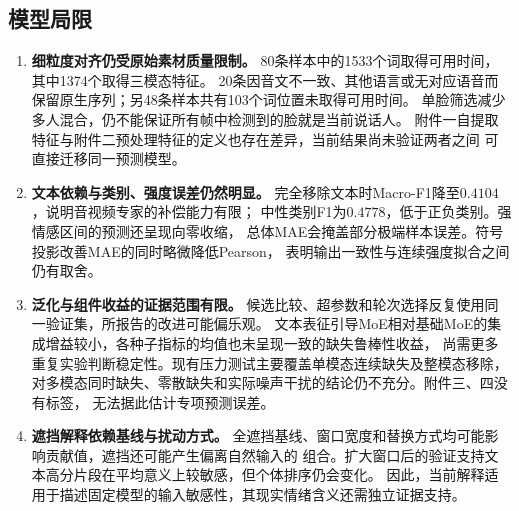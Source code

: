 \documentclass[bwprint]{gmcmthesis}
\begin{document}
\subsection{模型局限}
\begin{enumerate}
 \item \textbf{细粒度对齐仍受原始素材质量限制。}
 80条样本中的1533个词取得可用时间，其中1374个取得三模态特征。
 20条因音文不一致、其他语言或无对应语音而保留原生序列；另48条样本共有103个词位置未取得可用时间。
 单脸筛选减少多人混合，仍不能保证所有帧中检测到的脸就是当前说话人。
 附件一自提取特征与附件二预处理特征的定义也存在差异，当前结果尚未验证两者之间
 可直接迁移同一预测模型。

 \item \textbf{文本依赖与类别、强度误差仍然明显。}
 完全移除文本时Macro-F1降至$0.4104$，说明音视频专家的补偿能力有限；
 中性类别F1为$0.4778$，低于正负类别。强情感区间的预测还呈现向零收缩，
 总体MAE会掩盖部分极端样本误差。符号投影改善MAE的同时略微降低Pearson，
 表明输出一致性与连续强度拟合之间仍有取舍。

 \item \textbf{泛化与组件收益的证据范围有限。}
 候选比较、超参数和轮次选择反复使用同一验证集，所报告的改进可能偏乐观。
 文本表征引导MoE相对基础MoE的集成增益较小，各种子指标的均值也未呈现一致的缺失鲁棒性收益，
 尚需更多重复实验判断稳定性。现有压力测试主要覆盖单模态连续缺失及整模态移除，
 对多模态同时缺失、零散缺失和实际噪声干扰的结论仍不充分。附件三、四没有标签，
 无法据此估计专项预测误差。

 \item \textbf{遮挡解释依赖基线与扰动方式。}
 全遮挡基线、窗口宽度和替换方式均可能影响贡献值，遮挡还可能产生偏离自然输入的
 组合。扩大窗口后的验证支持文本高分片段在平均意义上较敏感，但个体排序仍会变化。
 因此，当前解释适用于描述固定模型的输入敏感性，其现实情绪含义还需独立证据支持。
\end{enumerate}
\end{document}
